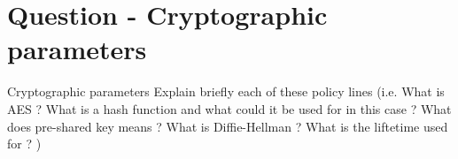 \section{Question - Cryptographic parameters}

\begin{questionBox}{Cryptographic parameters}
    Explain briefly each of these policy lines (i.e. What is AES ? What is a hash function and what could it be used for in this case ? What does pre-shared key means ? What is Diffie-Hellman ? What is the liftetime used for ? )
\end{questionBox}
